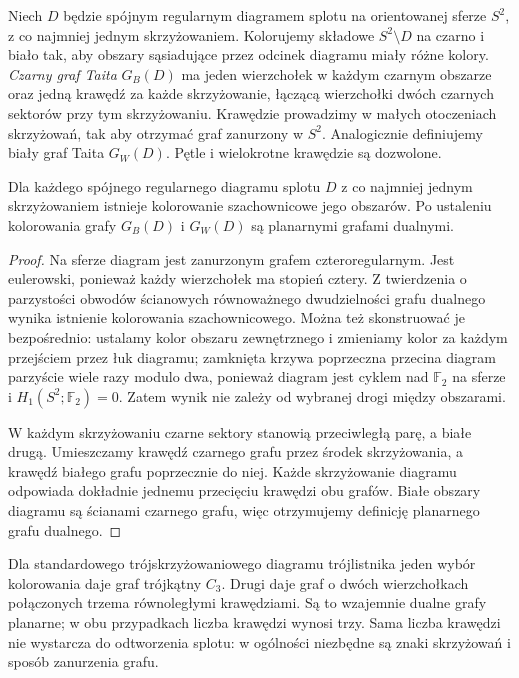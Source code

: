 \begin{definicja}
Niech $D$ będzie spójnym regularnym diagramem splotu
na orientowanej sferze $S^2$, z co najmniej jednym
skrzyżowaniem. Kolorujemy składowe $S^2\setminus D$
na czarno i biało tak, aby obszary sąsiadujące przez
odcinek diagramu miały różne kolory. \emph{Czarny graf
Taita} $G_B(D)$ ma jeden wierzchołek w każdym czarnym
obszarze oraz jedną krawędź za każde skrzyżowanie,
łączącą wierzchołki dwóch czarnych sektorów przy tym
skrzyżowaniu. Krawędzie prowadzimy w małych otoczeniach
skrzyżowań, tak aby otrzymać graf zanurzony w $S^2$.
Analogicznie definiujemy biały graf Taita $G_W(D)$.
Pętle i wielokrotne krawędzie są dozwolone.
\end{definicja}

\begin{stwierdzenie}
Dla każdego spójnego regularnego diagramu splotu $D$
z co najmniej jednym skrzyżowaniem istnieje kolorowanie
szachownicowe jego obszarów. Po ustaleniu kolorowania
grafy $G_B(D)$ i $G_W(D)$ są planarnymi grafami dualnymi.
\end{stwierdzenie}
\begin{proof}
Na sferze diagram jest zanurzonym grafem czteroregularnym.
Jest eulerowski, ponieważ każdy wierzchołek ma stopień
cztery. Z twierdzenia o parzystości obwodów ścianowych
równoważnego dwudzielności grafu dualnego wynika
istnienie kolorowania szachownicowego. Można też
skonstruować je bezpośrednio: ustalamy kolor obszaru
zewnętrznego i zmieniamy kolor za każdym przejściem
przez łuk diagramu; zamknięta krzywa poprzeczna przecina
diagram parzyście wiele razy modulo dwa, ponieważ diagram
jest cyklem nad $\mathbb F_2$ na sferze i
$H_1(S^2;\mathbb F_2)=0$. Zatem wynik nie zależy od
wybranej drogi między obszarami.

W każdym skrzyżowaniu czarne sektory stanowią przeciwległą
parę, a białe drugą. Umieszczamy krawędź czarnego grafu
przez środek skrzyżowania, a krawędź białego grafu
poprzecznie do niej. Każde skrzyżowanie diagramu odpowiada
dokładnie jednemu przecięciu krawędzi obu grafów.
Białe obszary diagramu są ścianami czarnego grafu,
więc otrzymujemy definicję planarnego grafu dualnego.
\end{proof}

\begin{przyklad}
Dla standardowego trójskrzyżowaniowego diagramu trójlistnika
jeden wybór kolorowania daje graf trójkątny $C_3$.
Drugi daje graf o dwóch wierzchołkach połączonych trzema
równoległymi krawędziami. Są to wzajemnie dualne grafy
planarne; w obu przypadkach liczba krawędzi wynosi trzy.
Sama liczba krawędzi nie wystarcza do odtworzenia splotu:
w ogólności niezbędne są znaki skrzyżowań i sposób
zanurzenia grafu.
\end{przyklad}

